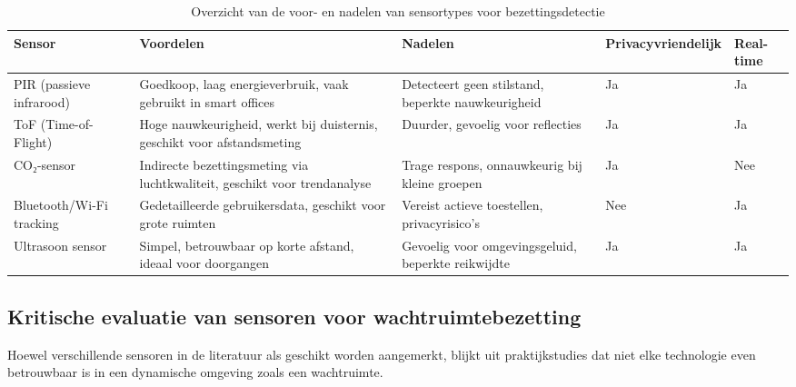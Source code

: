 \begin{table}[h!]
    \small
    \centering
    \caption{Overzicht van de voor- en nadelen van sensortypes voor bezettingsdetectie}
    \label{tab:sensorvergelijking}
    \begin{tabular}{|p{2.5cm}|p{3cm}|p{2.8cm}|p{3.4cm}|p{1.9cm}|}
        \hline
        \textbf{Sensor} & \textbf{Voordelen} & \textbf{Nadelen} & \textbf{Privacy\-vriendelijk} & \textbf{Real-time} \\ \hline
        PIR (passieve infrarood) & Goedkoop, laag energieverbruik, vaak gebruikt in smart offices & Detecteert geen stilstand, beperkte nauwkeurigheid & Ja & Ja \\ \hline
        ToF (Time-of-Flight) & Hoge nauwkeurigheid, werkt bij duisternis, geschikt voor afstandsmeting & Duurder, gevoelig voor reflecties & Ja & Ja \\ \hline
        CO₂-sensor & Indirecte bezettingsmeting via luchtkwaliteit, geschikt voor trendanalyse & Trage respons, onnauwkeurig bij kleine groepen & Ja & Nee \\ \hline
        Bluetooth/Wi-Fi tracking & Gedetailleerde gebruikersdata, geschikt voor grote ruimten & Vereist actieve toestellen, privacyrisico’s & Nee & Ja \\ \hline
        Ultrasoon sensor & Simpel, betrouwbaar op korte afstand, ideaal voor doorgangen & Gevoelig voor omgevingsgeluid, beperkte reikwijdte & Ja & Ja \\ \hline
    \end{tabular}
\end{table}


\subsection{Kritische evaluatie van sensoren voor wachtruimtebezetting}

Hoewel verschillende sensoren in de literatuur als geschikt worden aangemerkt, blijkt uit praktijkstudies dat niet elke technologie even betrouwbaar is in een dynamische omgeving zoals een wachtruimte.

